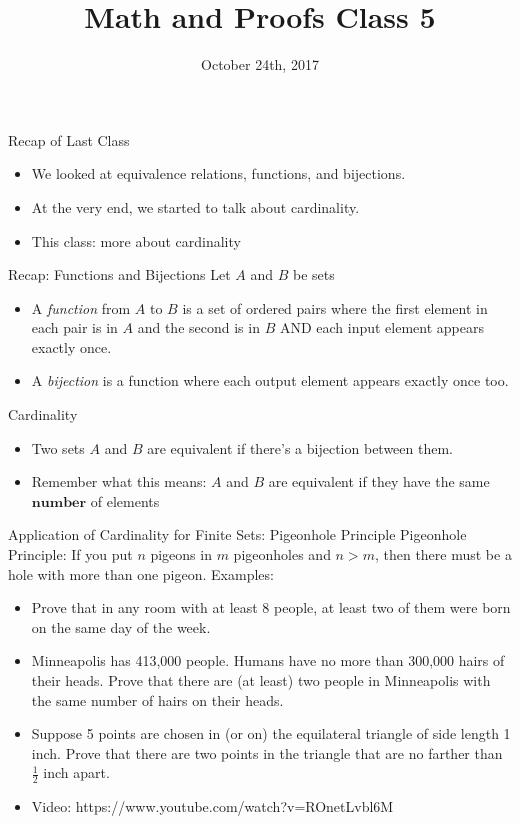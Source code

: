 \documentclass{beamer}
\begin{document}
\title[Math and Proofs]{Math and Proofs Class 5}
\date{October 24th, 2017}

\begin{frame}[plain]
\titlepage
\end{frame}

\begin{frame}{Recap of Last Class}
\begin{itemize}
\item We looked at equivalence relations, functions, and  bijections.
\item At the very end, we started to talk about cardinality.
\item This class: more about cardinality
\end{itemize}
\end{frame}

\begin{frame}{Recap: Functions and Bijections}
Let $A$ and $B$ be sets
\begin{itemize}
\item A \emph{function} from $A$ to $B$ is a set of ordered pairs where the first element in each pair is in $A$ and the second is in $B$ AND each input element appears exactly once.
\item A \emph{bijection} is a function where each output element appears exactly once too.
\end{itemize}
\end{frame}

\begin{frame}{Cardinality}
\begin{itemize}
\item Two sets $A$ and $B$ are equivalent if there's a bijection between them.
\item Remember what this means: $A$ and $B$ are equivalent if they have the same $\mathbf{number}$ of elements
\end{itemize}
\end{frame}

\begin{frame}{Application of Cardinality for Finite Sets: Pigeonhole Principle}
Pigeonhole Principle: If you put $n$ pigeons in $m$ pigeonholes and $n>m$, then there must be a hole with more than one pigeon.
Examples:
\begin{itemize}
\item Prove that in any room with at least 8 people, at least two of them were born on the same day of the week.
\item Minneapolis has 413,000 people. Humans have no more than 300,000 hairs of their heads. Prove that there are (at least) two people in Minneapolis with the same number of hairs on their heads.
\item Suppose 5 points are chosen in (or on) the equilateral triangle of side length 1 inch. Prove that there are two points in the triangle that are no farther than $\frac{1}{2}$ inch apart.
\item Video: https://www.youtube.com/watch?v=ROnetLvbl6M
\end{itemize}
\end{frame}
\end{document}
